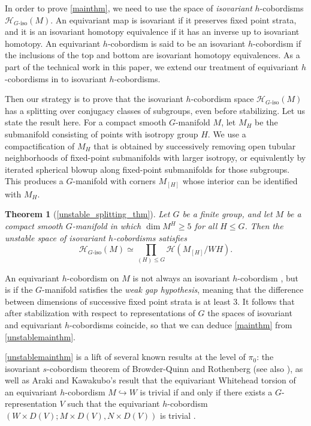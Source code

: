 \documentclass[11pt]{amsart}
\newtheorem{thm}{Theorem}[section]
\theoremstyle{definition}
\numberwithin{equation}{section}
\numberwithin{figure}{section}
\newcommand{\dashiso}{\textrm{-}\mathrm{iso}}
\begin{document}
In order to prove \autoref{mainthm}, we need to use the space of \emph{isovariant} $h$-cobordisms $\mathcal{H}_{G\dashiso}(M)$. An equivariant map is isovariant if it preserves fixed point strata, and it is an isovariant homotopy equivalence if it has an inverse up to isovariant homotopy. An equivariant $h$-cobordism is said to be an isovariant $h$-cobordism if the inclusions of the top and bottom are isovariant homotopy equivalences. As a part of the technical work in this paper, we extend our treatment of equivariant $h$-cobordisms in \cite{GIMM1} to isovariant $h$-cobordisms.
 
Then our strategy is to prove that the isovariant $h$-cobordism space $\mathcal{H}_{G\dashiso}(M)$ has a splitting over conjugacy classes of subgroups, even before stabilizing. Let us state the result here. For a compact smooth $G$-manifold $M$, let $M_H$ be the submanifold consisting of points with isotropy group $H$. We use a compactification of $M_H$ that is obtained by successively removing open tubular neighborhoods of fixed-point submanifolds with larger isotropy, or equivalently by iterated spherical blowup along fixed-point submanifolds for those subgroups. This produces a $G$-manifold with corners $M_{[H]}$ whose interior can be identified with $M_H$.
 
 \begin{thm}[\autoref{unstable_splitting_thm}]\label{unstablemainthm}
 Let $G$ be a finite group, and let $M$ be a compact smooth $G$-manifold in which $\dim M^H \geq 5$ for all $H \leq G$. Then the unstable space of isovariant $h$-cobordisms satisfies
 $$\mathcal{H}_{G\dashiso}(M)\simeq \prod_{(H) \leq G} \mathcal{H}(M_{[H]}/WH ).$$
 \end{thm}

An equivariant $h$-cobordism on $M$ is not always an isovariant $h$-cobordism \cite{luck}, but is if the $G$-manifold satisfies the \emph{weak gap hypothesis}, meaning that the difference between dimensions of successive fixed point strata is at least 3. It follows that after stabilization with respect to representations of $G$ the spaces of isovariant and equivariant $h$-cobordisms coincide, so that we can deduce \autoref{mainthm} from \autoref{unstablemainthm}.

\autoref{unstablemainthm} is a lift of several known results at the level of $\pi_0$: the isovariant $s$-cobordism theorem of Browder-Quinn \cite{equivsurgery} and Rothenberg \cite{rothenberg} (see also \cite{luck}), as well as Araki and Kawakubo's result that the equivariant Whitehead torsion of an equivariant $h$-cobordism $M\hookrightarrow W$ is trivial if and only if there exists a $G$-representation $V$ such that the equivariant $h$-cobordism $(W\times D(V); M\times D(V), N\times D(V))$ is trivial \cite{AK}. %
\end{document}

